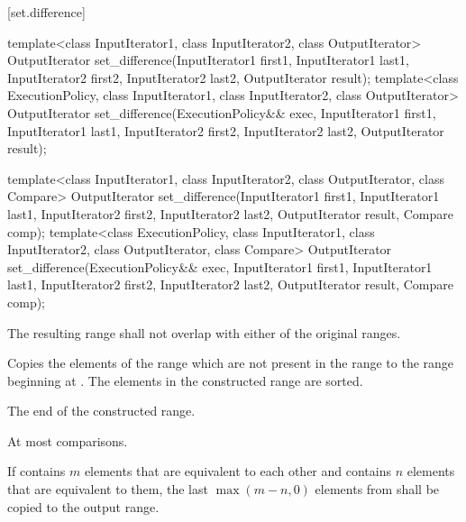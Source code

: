 [set.difference]{}

%
\begin{itemdecl}
template<class InputIterator1, class InputIterator2,
         class OutputIterator>
  OutputIterator
    set_difference(InputIterator1 first1, InputIterator1 last1,
                   InputIterator2 first2, InputIterator2 last2,
                   OutputIterator result);
template<class ExecutionPolicy, class InputIterator1, class InputIterator2,
           class OutputIterator>
  OutputIterator
    set_difference(ExecutionPolicy&& exec,
                   InputIterator1 first1, InputIterator1 last1,
                   InputIterator2 first2, InputIterator2 last2,
                   OutputIterator result);

template<class InputIterator1, class InputIterator2,
         class OutputIterator, class Compare>
  OutputIterator
    set_difference(InputIterator1 first1, InputIterator1 last1,
                   InputIterator2 first2, InputIterator2 last2,
                   OutputIterator result, Compare comp);
template<class ExecutionPolicy, class InputIterator1, class InputIterator2,
         class OutputIterator, class Compare>
  OutputIterator
    set_difference(ExecutionPolicy&& exec,
                   InputIterator1 first1, InputIterator1 last1,
                   InputIterator2 first2, InputIterator2 last2,
                   OutputIterator result, Compare comp);
\end{itemdecl}

\begin{itemdescr}
\pnum
\requires
The resulting range shall not overlap with either of the original ranges.

\pnum
\effects
Copies the elements of the range
which are not present in the range
to the range beginning at
.
The elements in the constructed range are sorted.

\pnum
\returns
The end of the constructed range.

\pnum
\complexity
At most
comparisons.

\pnum
\remarks
If
contains $m$
elements that are equivalent to each other and
contains $n$
elements that are equivalent to them, the last
$\max(m - n, 0)$
elements from
shall be copied to the output range.
\end{itemdescr}

